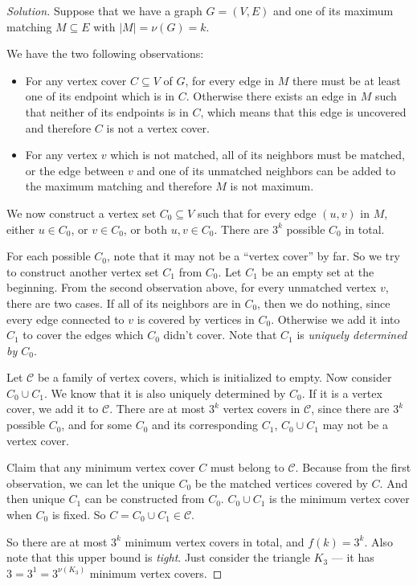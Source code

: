     \begin{proof}[Solution]
        Suppose that we have a graph $G = (V, E)$ and one of its maximum matching $M \subseteq E$ with $|M| = \nu(G) = k$.
        
        We have the two following observations:
        
        \begin{itemize}
            \item For any vertex cover $C \subseteq V$ of $G$, for every edge in $M$ there must be at least one of its endpoint which is in $C$. Otherwise there exists an edge in $M$ such that neither of its endpoints is in $C$, which means that this edge is uncovered and therefore $C$ is not a vertex cover.
            \item For any vertex $v$ which is not matched, all of its neighbors must be matched, or the edge between $v$ and one of its unmatched neighbors can be added to the maximum matching and therefore $M$ is not maximum.
        \end{itemize}
        
        We now construct a vertex set $C_0 \subseteq V$ such that for every edge $(u, v)$ in $M$, either $u \in C_0$, or $v \in C_0$, or both $u, v \in C_0$. There are $3^k$ possible $C_0$ in total.
        
        For each possible $C_0$, note that it may not be a ``vertex cover'' by far. So we try to construct another vertex set $C_1$ from $C_0$. Let $C_1$ be an empty set at the beginning. From the second observation above, for every unmatched vertex $v$, there are two cases. If all of its neighbors are in $C_0$, then we do nothing, since every edge connected to $v$ is covered by vertices in $C_0$. Otherwise we add it into $C_1$ to cover the edges which $C_0$ didn't cover. Note that $C_1$ is {\it uniquely determined by $C_0$}.
        
        Let $\mathcal{C}$ be a family of vertex covers, which is initialized to empty. Now consider $C_0 \cup C_1$. We know that it is also uniquely determined by $C_0$. If it is a vertex cover, we add it to $\mathcal{C}$. There are at most $3^k$ vertex covers in $\mathcal{C}$, since there are $3^k$ possible $C_0$, and for some $C_0$ and its corresponding $C_1$, $C_0 \cup C_1$ may not be a vertex cover.
        
        Claim that any minimum vertex cover $C$ must belong to $\mathcal{C}$. Because from the first observation, we can let the unique $C_0$ be the matched vertices covered by $C$. And then unique $C_1$ can be constructed from $C_0$. $C_0 \cup C_1$ is the minimum vertex cover when $C_0$ is fixed. So $C = C_0 \cup C_1 \in \mathcal{C}$.
        
        So there are at most $3^k$ minimum vertex covers in total, and $f(k) = 3^k$. Also note that this upper bound is {\it tight}. Just consider the triangle $K_3$ --- it has $3 = 3^1 = 3^{\nu(K_3)}$ minimum vertex covers.
    \end{proof}

